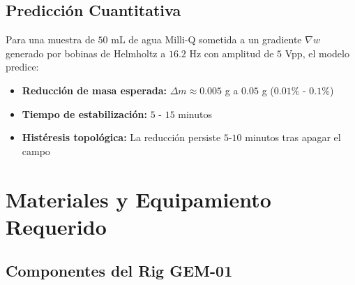 \documentclass[12pt, a4paper]{article}
\begin{document}
\subsection{Predicción Cuantitativa}
Para una muestra de $50$ mL de agua Milli-Q sometida a un gradiente $\nabla w$ generado por bobinas de Helmholtz a $16.2$ Hz con amplitud de $5$ Vpp, el modelo predice:
\begin{itemize}
    \item \textbf{Reducción de masa esperada:} $\Delta m \approx 0.005$ g a $0.05$ g ($0.01\%$ - $0.1\%$)
    \item \textbf{Tiempo de estabilización:} $5$ - $15$ minutos
    \item \textbf{Histéresis topológica:} La reducción persiste $5$-$10$ minutos tras apagar el campo
\end{itemize}

\section{Materiales y Equipamiento Requerido}

\subsection{Componentes del Rig GEM-01}
\end{document}
